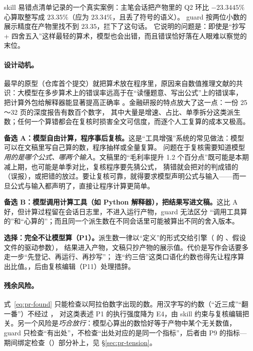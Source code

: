 \begin{failcase}[：心算取整]
skill 易错点清单记录的一个真实案例：主笔会话把产物里的 Q2 环比 $-23.3445\%$ 心算取整写成 $23.35\%$（应为 $23.34\%$，且丢了符号的语义）。
guard 按两位小数的展示精度在产物里找不到 $23.35$，拦下了这句话。
它说明的问题是：即使是“抄写 + 四舍五入”这样最轻的算术，模型也会出错，而且错误恰好落在人眼难以察觉的末位。
\end{failcase}

\paragraph{设计动机。}\sysname{} 最早的原型（仓库首个提交）就把算术放在程序里，原因来自数值推理文献的共识：大模型在多步算术上的错误率远高于在“读懂题意、写出公式”上的错误率，
把计算外包给解释器能显著提高正确率 \citep{gao2023pal,chen2023pot}。金融研报的特点放大了这一点：一份 25～32 页的深度报告有数百个数字，
其中大量是增速、占比、单季拆分这类派生数；任何一个算错都会在复核时损害全文可信度，而逐个人工复算的成本又极高。

\begin{tradeoff}
\textbf{备选 A：模型自由计算，程序事后复核。}这是“工具增强”系统的常见做法：模型可以在文稿里写自己算的数，程序抽样或全量复算。
问题在于复核需要知道模型\emph{用的是哪个公式、哪两个输入}。文稿里的“毛利率提升 1.2 个百分点”既可能是本期减上期，也可能是单季对比，复核程序要先猜公式，
猜错就会把对的判成错的（误报），或把错的放过。要让复核可靠，就得要求模型声明公式与输入——而一旦公式与输入都声明了，直接让程序计算更简单。

\textbf{备选 B：模型调用计算工具（如 Python 解释器），把结果写进文稿。}这比 A 好，但计算过程留在会话日志里，不进入运行产物，guard 无法区分
“调用工具算的”和“心算的”；而且同一个派生数在不同会话里可能被算出不同的舍入版本。

\textbf{选择：完全不让模型算（P1）。}派生数一律以“定义”的形式交给引擎（ 的 、假设文件的驱动参数），
结果进入产物，文稿只抄产物的展示值。代价是写作会话要多走一步“先登记、再运行、再抄写”；
连“约三倍”这类口语化约数也得先让程序算出比值。，后由复核编辑（P11）处理措辞。
\end{tradeoff}

\paragraph{残余风险。}式~\eqref{eq:pr-found} 只能检查以阿拉伯数字出现的数。用汉字写的约数（“近三成”“翻一番”）不经过 ，
对这类表述 P1 的执行强度降为 E4，由 skill 约束与复核编辑把关。另一个风险是\emph{巧合放行}：模型心算出的数恰好等于产物中某个无关数值，
guard 只检查“有出处”，不检查“出处对应的是同一个指标”，后者由 P9 的指标—期间绑定检查（）部分补上，见 \S\ref{sec:pr-tension}。

